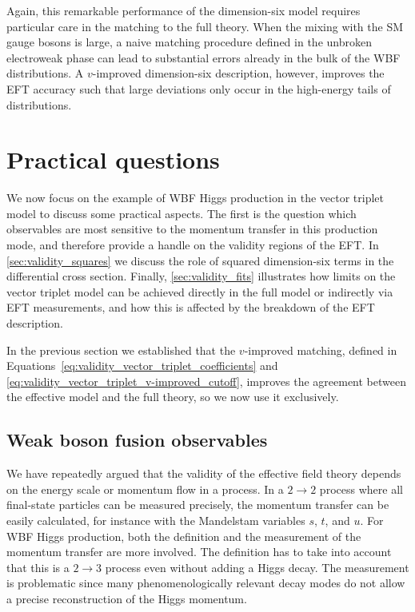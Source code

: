 Again, this remarkable performance of the dimension-six model requires
particular care in the matching to the full theory. When the mixing
with the SM gauge bosons is large, a naive matching procedure defined
in the unbroken electroweak phase can lead to substantial errors
already in the bulk of the WBF distributions. A $v$-improved
dimension-six description, however, improves the EFT accuracy such
that large deviations only occur in the high-energy tails of
distributions.




\section{Practical questions}
\label{sec:validity_practical_questions}

We now focus on the example of WBF Higgs production in the vector
triplet model to discuss some practical aspects. The first is the
question which observables are most sensitive to the momentum transfer
in this production mode, and therefore provide a handle on the
validity regions of the EFT. In \autoref{sec:validity_squares} we
discuss the role of squared dimension-six terms in the differential
cross section. Finally, \autoref{sec:validity_fits} illustrates how
limits on the vector triplet model can be achieved directly in the
full model or indirectly via EFT measurements, and how this is
affected by the breakdown of the EFT description.

In the previous section we established that the $v$-improved matching,
defined in Equations~\eqref{eq:validity_vector_triplet_coefficients}
and \eqref{eq:validity_vector_triplet_v-improved_cutoff}, improves the
agreement between the effective model and the full theory, so we now
use it exclusively.



\subsection{Weak boson fusion observables}
\label{sec:validity_wbf_observables}

We have repeatedly argued that the validity of the effective field
theory depends on the energy scale or momentum flow in a process. In a
$2 \to 2$ process where all final-state particles can be measured
precisely, the momentum transfer can be easily calculated, for
instance with the Mandelstam variables $s$, $t$, and $u$. For WBF
Higgs production, both the definition and the measurement of the
momentum transfer are more involved. The definition has to take into
account that this is a $2 \to 3$ process even without adding a Higgs
decay. The measurement is problematic since many phenomenologically
relevant decay modes do not allow a precise reconstruction of the
Higgs momentum.

